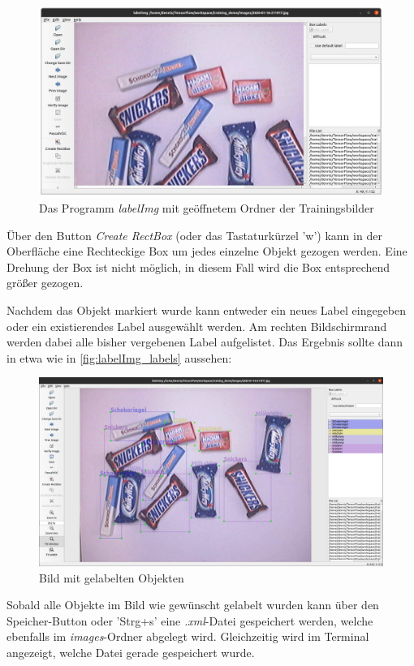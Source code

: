 \documentclass[12pt, oneside]{article}
\begin{document}
\begin{figure}[htbp]
	\centering
	\includegraphics[width=0.8\linewidth]{Bilder/misc/labelImg_open.png}
	\caption{Das Programm \textit{labelImg} mit geöffnetem Ordner der Trainingsbilder}
	\label{fig:labelImg_open}
\end{figure}    
Über den Button \textit{Create RectBox} (oder das Tastaturkürzel 'w') kann in der Oberfläche eine Rechteckige Box um jedes einzelne Objekt gezogen werden. Eine Drehung der Box ist nicht möglich, in diesem Fall wird die Box entsprechend größer gezogen.

Nachdem das Objekt markiert wurde kann entweder ein neues Label eingegeben oder ein existierendes Label ausgewählt werden. Am rechten Bildschirmrand werden dabei alle bisher vergebenen Label aufgelistet. Das Ergebnis sollte dann in etwa wie in \autoref{fig:labelImg_labels} aussehen:

\begin{figure}[htbp]
	\centering
	\includegraphics[width=0.8\linewidth]{Bilder/misc/labelImg_labels.png}
	\caption{Bild mit gelabelten Objekten}
	\label{fig:labelImg_labels}
\end{figure}
Sobald alle Objekte im Bild wie gewünscht gelabelt wurden kann über den Speicher-Button oder 'Strg+s' eine \textit{.xml}-Datei gespeichert werden, welche ebenfalls im \textit{images}-Ordner abgelegt wird. Gleichzeitig wird im Terminal angezeigt, welche Datei gerade gespeichert wurde.
\end{document}
